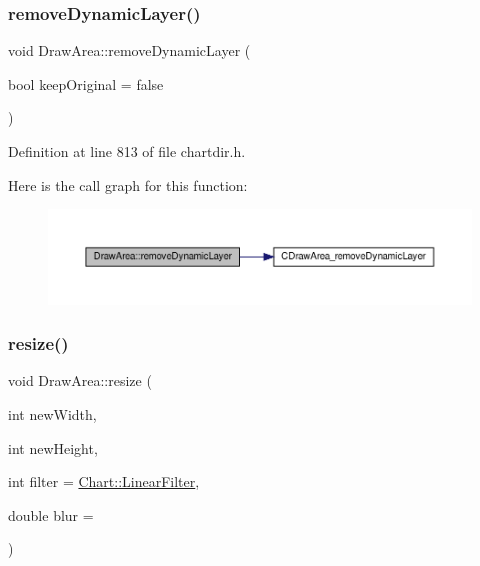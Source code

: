 \subsubsection{\texorpdfstring{remove\+Dynamic\+Layer()}{removeDynamicLayer()}}
{\footnotesize\ttfamily void Draw\+Area\+::remove\+Dynamic\+Layer (\begin{DoxyParamCaption}\item[{bool}]{keep\+Original = {\ttfamily false} }\end{DoxyParamCaption})\hspace{0.3cm}{\ttfamily [inline]}}



Definition at line 813 of file chartdir.\+h.

Here is the call graph for this function\+:
\nopagebreak
\begin{figure}[H]
\begin{center}
\leavevmode
\includegraphics[width=350pt]{class_draw_area_ae5d7c28f828147c3c444676139010b00_cgraph}
\end{center}
\end{figure}
\mbox{\label{class_draw_area_ac5d26003a57fdab61b98ec6464af27e9}} 
\subsubsection{\texorpdfstring{resize()}{resize()}}
{\footnotesize\ttfamily void Draw\+Area\+::resize (\begin{DoxyParamCaption}\item[{int}]{new\+Width,  }\item[{int}]{new\+Height,  }\item[{int}]{filter = {\ttfamily \hyperlink{namespace_chart_ab75b9aa1781d0e0159ef1d441b577764a8cd729b7a982bac2dce8b021511e3ac6}{Chart\+::\+Linear\+Filter}},  }\item[{double}]{blur = {} }\end{DoxyParamCaption})\hspace{0.3cm}{\ttfamily [inline]}}



